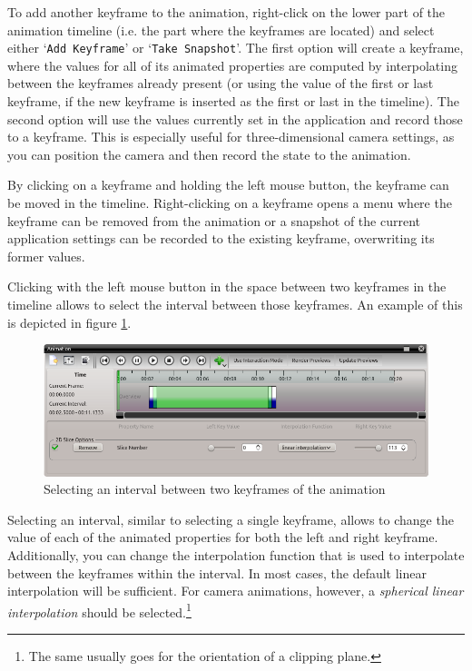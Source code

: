 To add another keyframe to the animation, right-click on the lower part of the animation timeline (i.e. the part where the keyframes are located) and select either
`\verb|Add Keyframe|' or `\verb|Take Snapshot|'. The first option will create a keyframe, where the values for all of its animated properties are computed by interpolating 
between the keyframes already present (or using the value of the first or last keyframe, if the new keyframe is inserted as the first or last in the timeline). The 
second option will use the values currently set in the \Voreen application and record those to a keyframe. This is especially useful for three-dimensional camera settings,
as you can position the camera and then record the state to the animation.

By clicking on a keyframe and holding the left mouse button, the keyframe can be moved in the timeline. Right-clicking on a keyframe opens a menu where the keyframe 
can be removed from the animation or a snapshot of the current application settings can be recorded to the existing keyframe, overwriting its former values.

Clicking with the left mouse button in the space between two keyframes in the timeline allows to select the interval between those keyframes. 
An example of this is depicted in figure \ref{fig:animation_interval}.
\begin{figure}[!htb]
 \centering
 \includegraphics[scale=0.5,keepaspectratio=true]{./images/animation_interval.png}
 \caption{Selecting an interval between two keyframes of the animation}
 \label{fig:animation_interval}
\end{figure}
Selecting an interval, similar to selecting a single keyframe, allows to change the value of each of the animated properties for both the left and right keyframe.
Additionally, you can change the interpolation function that is used to interpolate between the keyframes within the interval. In most cases, the default linear 
interpolation will be sufficient. For camera animations, however, a \emph{spherical linear interpolation} should be selected.\footnote{The same
usually goes for the orientation of a clipping plane.}

